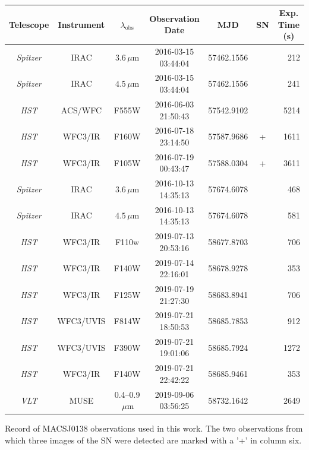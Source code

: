 \documentclass[12pt,dvipsnames]{article}
\begin{document}
\begin{table}[h]
\centering
\begin{tabular}{ccccccr}
    \multicolumn{1}{c}{Telescope} & \multicolumn{1}{c}{Instrument} & \multicolumn{1}{c}{$\lambda_\mathrm{obs}$} & \multicolumn{1}{c}{Observation Date} & \multicolumn{1}{c}{MJD} & \multicolumn{1}{c}{SN} & \multicolumn{1}{c}{Exp. Time (s)}\\

\midrule
\textit{Spitzer} & IRAC      & $3.6\,\mu\mathrm{m}$      & 2016-03-15 03:44:04 & 57462.1556 &   & 212 \\ %
\textit{Spitzer} & IRAC      & $4.5\,\mu\mathrm{m}$      & 2016-03-15 03:44:04 & 57462.1556 &   & 241 \\
\textit{HST}     & ACS/WFC   & F555W                     & 2016-06-03 21:50:43 & 57542.9102 &   & 5214 \\
\textit{HST}     & WFC3/IR   & F160W                     & 2016-07-18 23:14:50 & 57587.9686 & + & 1611 \\
\textit{HST}     & WFC3/IR   & F105W                     & 2016-07-19 00:43:47 & 57588.0304 & + & 3611 \\ 
\textit{Spitzer} & IRAC      & $3.6\,\mu\mathrm{m}$      & 2016-10-13 14:35:13 & 57674.6078 &   & 468 \\ %
\textit{Spitzer} & IRAC      & $4.5\,\mu\mathrm{m}$      & 2016-10-13 14:35:13 & 57674.6078 &   & 581 \\
\midrule
\textit{HST}     & WFC3/IR   & F110w                     & 2019-07-13 20:53:16 & 58677.8703 &   & 706 \\ 
\textit{HST}     & WFC3/IR   & F140W                     & 2019-07-14 22:16:01 & 58678.9278 &   & 353 \\ 
\textit{HST}     & WFC3/IR   & F125W                     & 2019-07-19 21:27:30 & 58683.8941 &   & 706 \\ 
\textit{HST}     & WFC3/UVIS & F814W                     & 2019-07-21 18:50:53 & 58685.7853 &   & 912 \\ 
\textit{HST}     & WFC3/UVIS & F390W                     & 2019-07-21 19:01:06 & 58685.7924 &   & 1272 \\ 
\textit{HST}     & WFC3/IR   & F140W                     & 2019-07-21 22:42:22 & 58685.9461 &   & 353 \\ 
\textit{VLT}     & MUSE      & 0.4--0.9$\,\mu\mathrm{m}$ & 2019-09-06 03:56:25 & 58732.1642 &   & 2649  \\
\end{tabular}
\caption{Record of MACSJ0138 observations used in this work.  
The two observations from which three images of the SN were detected are marked with a '+' in column six.
\label{tab:observations}
}
\caption{}
\end{table}
\end{document}
